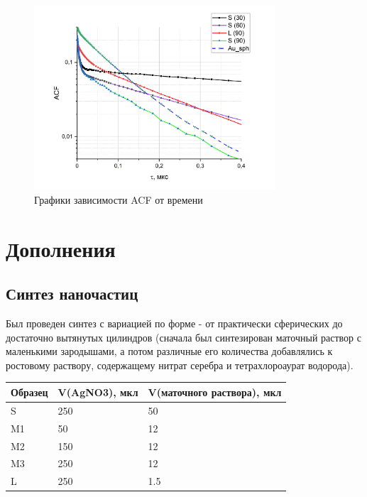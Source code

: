 \documentclass[a4paper,12pt]{article} %
\begin{document}
\begin{figure}[h]
\begin{center}
\includegraphics[width=0.8\textwidth]{_fBnuR-wyHo.jpg}
\caption{Графики зависимости ACF от времени}
\end{center}
\end{figure}



\clearpage

\section{Дополнения}

\subsection{Синтез наночастиц}
Был проведен синтез с вариацией по форме - от практически сферических до достаточно вытянутых цилиндров (сначала был синтезирован маточный раствор с маленькими зародышами, а потом различные его количества добавлялись к ростовому раствору, содержащему нитрат серебра и тетрахлороаурат водорода).


\begin{table}[h]
\begin{center}
\begin{tabular}{|l|l|l|}
\hline
Образец & V(AgNO3), мкл & V(маточного раствора), мкл \\ \hline
S       & 250           & 50                         \\ \hline
M1      & 50            & 12                         \\ \hline
M2      & 150           & 12                         \\ \hline
M3      & 250           & 12                         \\ \hline
L       & 250           & 1.5                        \\ \hline
\end{tabular}
\end{center}
\end{table}
\end{document}

